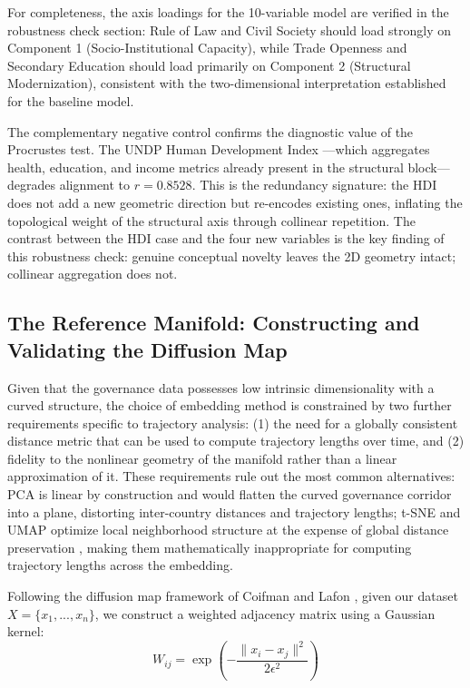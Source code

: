 \documentclass[12pt]{article}
\begin{document}
For completeness, the axis loadings for the 10-variable model are verified in the robustness check section: Rule of Law and Civil Society should load strongly on Component 1 (Socio-Institutional Capacity), while Trade Openness and Secondary Education should load primarily on Component 2 (Structural Modernization), consistent with the two-dimensional interpretation established for the baseline model.

The complementary negative control confirms the diagnostic value of the Procrustes test. The UNDP Human Development Index \cite{undp2024hdi}---which aggregates health, education, and income metrics already present in the structural block---degrades alignment to $r = 0.8528$. This is the redundancy signature: the HDI does not add a new geometric direction but re-encodes existing ones, inflating the topological weight of the structural axis through collinear repetition. The contrast between the HDI case and the four new variables is the key finding of this robustness check: genuine conceptual novelty leaves the 2D geometry intact; collinear aggregation does not.

\subsection{The Reference Manifold: Constructing and Validating the Diffusion Map}

Given that the governance data possesses low intrinsic dimensionality with a curved structure, the choice of embedding method is constrained by two further requirements specific to trajectory analysis: (1) the need for a globally consistent distance metric that can be used to compute trajectory lengths over time, and (2) fidelity to the nonlinear geometry of the manifold rather than a linear approximation of it. These requirements rule out the most common alternatives: PCA is linear by construction and would flatten the curved governance corridor into a plane, distorting inter-country distances and trajectory lengths; t-SNE and UMAP optimize local neighborhood structure at the expense of global distance preservation \cite{roweis2000nonlinear, tenenbaum2000global}, making them mathematically inappropriate for computing trajectory lengths across the embedding.

Following the diffusion map framework of Coifman and Lafon \cite{coifman2006diffusion}, given our dataset $X = \{x_1, ..., x_n\}$, we construct a weighted adjacency matrix using a Gaussian kernel:
$$W_{ij} = \exp\left(-\frac{\lVert x_i - x_j \rVert^2}{2\epsilon^2}\right)$$
\end{document}
